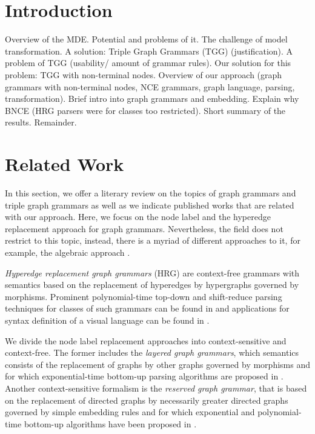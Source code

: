 \documentclass[]{report}
\title{}
\author{William Bombardelli da Silva}
\begin{document}
\maketitle

\begin{abstract}
\end{abstract}

\tableofcontents
\newpage

\section{Introduction}
Overview of the MDE. Potential and problems of it. The challenge of model transformation. A solution: Triple Graph Grammars (TGG) (justification). A problem of TGG (usability/ amount of grammar rules). Our solution for this problem: TGG with non-terminal nodes. Overview of our approach (graph grammars with non-terminal nodes, NCE grammars, graph language, parsing, transformation). Brief intro into graph grammars and embedding. Explain why BNCE (HRG parsers were for classes too restricted). Short summary of the results. Remainder.

\section{Related Work}
In this section, we offer a literary review on the topics of graph grammars and triple graph grammars as well as we indicate published works that are related with our approach. Here, we focus on the node label and the hyperedge replacement approach for graph grammars. Nevertheless, the field does not restrict to this topic, instead, there is a myriad of different approaches to it, for example, the algebraic approach \cite{ehrig1999handbook}.

\textit{Hyperedge replacement graph grammars} (HRG) are context-free grammars with semantics based on the replacement of hyperedges by hypergraphs \cite{drewes1997hyperedge} governed by morphisms. Prominent polynomial-time top-down and shift-reduce parsing techniques for classes of such grammars can be found in \cite{drewes2015predictive,drewes2017predictive,bjorklund2016between,chiang2013parsing} and applications for syntax definition of a visual language can be found in \cite{minas2006syntax,engelfriet1998tree}.

We divide the node label replacement approaches into context-sensitive and context-free. The former includes the \textit{layered graph grammars}, which semantics consists of the replacement of graphs by other graphs governed by morphisms \cite{rekers1997defining} and for which exponential-time bottom-up parsing algorithms are proposed in \cite{rekers1995graph,bottoni2000efficient,furst2011improving}. Another context-sensitive formalism is the \textit{reserved graph grammar}, that is based on the replacement of directed graphs by necessarily greater directed graphs governed by simple embedding rules \cite{zhang2001context} and for which exponential and polynomial-time bottom-up algorithms have been proposed in \cite{zeng2005rgg+,zou2017partial}.
\end{document}
